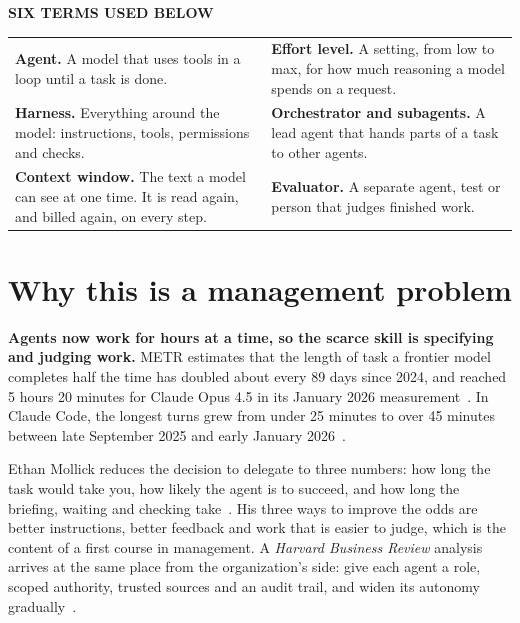 \documentclass[11pt,letterpaper]{article}
\newcommand{\takeaway}[1]{\textbf{#1}}
\newcommand{\boxlabel}[1]{{\sffamily\footnotesize\bfseries\color{ink2} #1}}
\begin{document}
\vspace{0.7em}
\boxlabel{SIX TERMS USED BELOW}\par
\vspace{-0.15em}
{\small
\begin{tabularx}{\textwidth}{@{}Y@{\hspace{1.6em}}Y@{}}
\textbf{Agent.} A model that uses tools in a loop until a task is done. &
\textbf{Effort level.} A setting, from low to max, for how much reasoning a model spends on
a request. \\ \addlinespace[0.45em]
\textbf{Harness.} Everything around the model: instructions, tools, permissions and checks. &
\textbf{Orchestrator and subagents.} A lead agent that hands parts of a task to other agents. \\ \addlinespace[0.45em]
\textbf{Context window.} The text a model can see at one time. It is read again, and billed
again, on every step. &
\textbf{Evaluator.} A separate agent, test or person that judges finished work. \\
\end{tabularx}}

\section{Why this is a management problem}\label{sec:why}

\takeaway{Agents now work for hours at a time, so the scarce skill is specifying and judging
work.} METR estimates that the length of task a frontier model completes half the time has
doubled about every 89 days since 2024, and reached 5 hours 20 minutes for Claude Opus 4.5 in
its January 2026 measurement~\cite{metr}. In Claude Code, the longest turns grew from under
25 minutes to over 45 minutes between late September 2025 and early January
2026~\cite{autonomy}.

Ethan Mollick reduces the decision to delegate to three numbers: how long the task would take
you, how likely the agent is to succeed, and how long the briefing, waiting and checking
take~\cite{mollick}. His three ways to improve the odds are better instructions, better
feedback and work that is easier to judge, which is the content of a first course in
management. A \emph{Harvard Business Review} analysis arrives at the same place from the
organization's side: give each agent a role, scoped authority, trusted sources and an audit
trail, and widen its autonomy gradually~\cite{hbr}.
\end{document}
